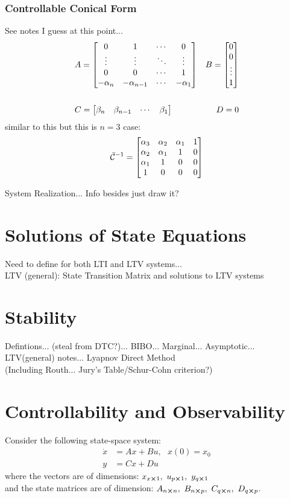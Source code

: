 \documentclass[]{article}
\newcommand{\ctrb}{\mathcal{C}}
\begin{document}
	\subsubsection*{Controllable Conical Form}
		See notes I guess at this point... \\
		\begin{align*}
			&A = \mqty[	0 & 1 & \cdots & 0 \\
			\vdots & \vdots & \ddots &\vdots \\
			0 & 0 & \cdots & 1 \\
			-\alpha_n & -\alpha_{n-1} & \cdots & -\alpha_1]
			&B = \mqty[	0\\ 0\\ \vdots\\ 1] \\ && \\
			&C = \mqty[	\beta_n & \beta_{n-1} &\cdots & \beta_1]
			&D = 0
		\end{align*}
	similar to this but this is $n=3$ case:
			\begin{align*}
				\bar{\ctrb}^{-1} 	= \mqty[\alpha_3 & \alpha_2 & \alpha_1 & 1 \\
				\alpha_2 & \alpha_1 & 1 & 0 \\
				\alpha_1 & 1 & 0 & 0 \\
				1 & 0 & 0 & 0]
			\end{align*}

System Realization... Info besides just draw it?\\

\section*{Solutions of State Equations}

Need to define for both LTI and LTV systems...\\
LTV (general): State Transition Matrix and solutions to LTV systems


\section*{Stability}
Defintions... (steal from DTC?)... BIBO... Marginal... Asymptotic...\\
LTV(general) notes... Lyapnov Direct Method\\
(Including Routh... Jury's Table/Schur-Cohn criterion?)




\newpage
\section*{Controllability and Observability}
	Consider the following state-space system:
	\begin{align*}
		\dot{x}	&= A x + B u, \ \ \ x(0)=x_0\\
		y		&= C x + D u
	\end{align*}
	where the vectors are of dimensions: $x_{x\cross1},\ u_{p\cross1},\ y_{q\cross1}$\\
	and the state matrices are of dimension: $A_{n \cross n},\ B_{n \cross p},\ C_{q\cross n},\ D_{q\cross p}$.
\end{document}
